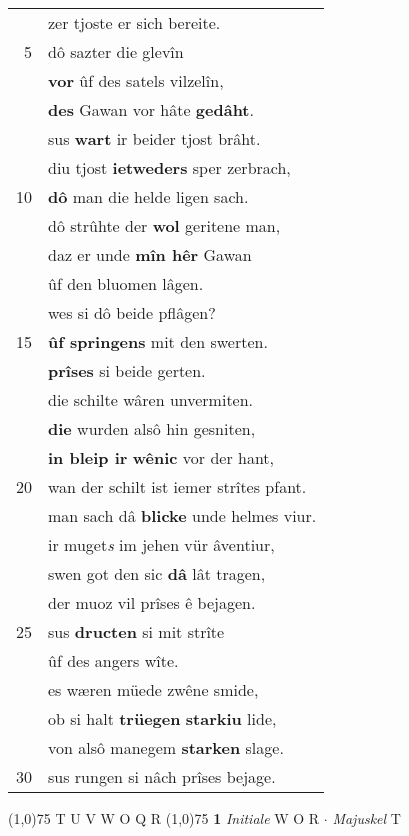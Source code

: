 \documentclass[8pt,a4paper,notitlepage]{article}
\begin{document}
\begin{table}[ht]
\begin{minipage}[t]{0.5\linewidth}
\begin{tabular}{rl}
 & zer tjoste er sich bereite.\\ 
5 & dô sazter die glevîn\\ 
 & \textbf{vor} ûf des satels vilzelîn,\\ 
 & \textbf{des} Gawan vor hâte \textbf{gedâht}.\\ 
 & sus \textbf{wart} ir beider tjost brâht.\\ 
 & diu tjost \textbf{ietweders} sper zerbrach,\\ 
10 & \textbf{dô} man die helde ligen sach.\\ 
 & dô strûhte der \textbf{wol} geritene man,\\ 
 & daz er unde \textbf{mîn hêr} Gawan\\ 
 & ûf den bluomen lâgen.\\ 
 & wes si dô beide pflâgen?\\ 
15 & \textbf{ûf springens} mit den swerten.\\ 
 & \textbf{prîses} si beide gerten.\\ 
 & die schilte wâren unvermiten.\\ 
 & \textbf{die} wurden alsô hin gesniten,\\ 
 & \textbf{in bleip ir} \textbf{wênic} vor der hant,\\ 
20 & wan der schilt ist iemer strîtes pfant.\\ 
 & man sach dâ \textbf{blicke} unde helmes viur.\\ 
 & ir muget\textit{s} im jehen vür âventiur,\\ 
 & swen got den sic \textbf{dâ} lât tragen,\\ 
 & der muoz vil prîses ê bejagen.\\ 
25 & sus \textbf{dructen} si mit strîte\\ 
 & ûf des angers wîte.\\ 
 & es wæren müede zwêne smide,\\ 
 & ob si halt \textbf{trüegen} \textbf{starkiu} lide,\\ 
 & von alsô manegem \textbf{starken} slage.\\ 
30 & sus rungen si nâch prîses bejage.\\ 
\end{tabular}
\scriptsize
\line(1,0){75} \newline
T U V W O Q R \newline
\line(1,0){75} \newline
\textbf{1} \textit{Initiale} W O R   $\cdot$ \textit{Majuskel} T  \newline

\end{minipage}
\end{table}
\end{document}
